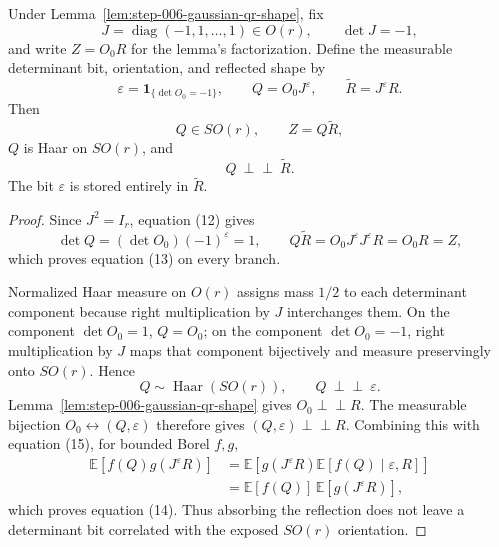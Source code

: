 \begin{proposition}
\label{prop:step-006-reflection-absorption}
Under Lemma~\ref{lem:step-006-gaussian-qr-shape}, fix
\[
  J=\operatorname{diag}(-1,1,\ldots,1)\in O(r),
  \qquad \det J=-1,
\]
and write \(Z=O_0R\) for the lemma's factorization. Define the measurable
determinant bit, orientation, and reflected shape by
\[
  \varepsilon=\mathbf 1_{\{\det O_0=-1\}},\qquad
  Q=O_0J^{\varepsilon},\qquad
  \widetilde R=J^{\varepsilon}R.                              \tag{12}
\]
Then
\[
  Q\in SO(r),\qquad Z=Q\widetilde R,                           \tag{13}
\]
\(Q\) is Haar on \(SO(r)\), and
\[
  Q\ \perp\!\!\!\perp\ \widetilde R.                       \tag{14}
\]
The bit \(\varepsilon\) is stored entirely in \(\widetilde R\).

\end{proposition}

\begin{proof}
Since \(J^2=I_r\), equation (12) gives
\[
  \det Q=(\det O_0)(-1)^{\varepsilon}=1,
  \qquad
  Q\widetilde R=O_0J^{\varepsilon}J^{\varepsilon}R=O_0R=Z,
\]
which proves equation (13) on every branch.

Normalized Haar measure on \(O(r)\) assigns mass \(1/2\) to each determinant
component because right multiplication by \(J\) interchanges them. On the
component \(\det O_0=1\), \(Q=O_0\); on the component \(\det O_0=-1\), right
multiplication by \(J\) maps that component bijectively and measure
preservingly onto \(SO(r)\). Hence
\[
  Q\sim\operatorname{Haar}(SO(r)),\qquad
  Q\ \perp\!\!\!\perp\ \varepsilon.                         \tag{15}
\]
Lemma~\ref{lem:step-006-gaussian-qr-shape} gives
\(O_0\perp\!\!\!\perp R\). The measurable bijection
\(O_0\leftrightarrow(Q,\varepsilon)\) therefore gives
\((Q,\varepsilon)\perp\!\!\!\perp R\). Combining this with equation (15),
for bounded Borel \(f,g\),
\[
\begin{aligned}
  \mathbb E[f(Q)g(J^{\varepsilon}R)]
  &=\mathbb E\!\left[g(J^{\varepsilon}R)
      \mathbb E[f(Q)\mid\varepsilon,R]\right]\\
  &=\mathbb E[f(Q)]\,\mathbb E[g(J^{\varepsilon}R)],
\end{aligned}
\]
which proves equation (14). Thus absorbing the reflection does not leave a
determinant bit correlated with the exposed \(SO(r)\) orientation.


\end{proof}



